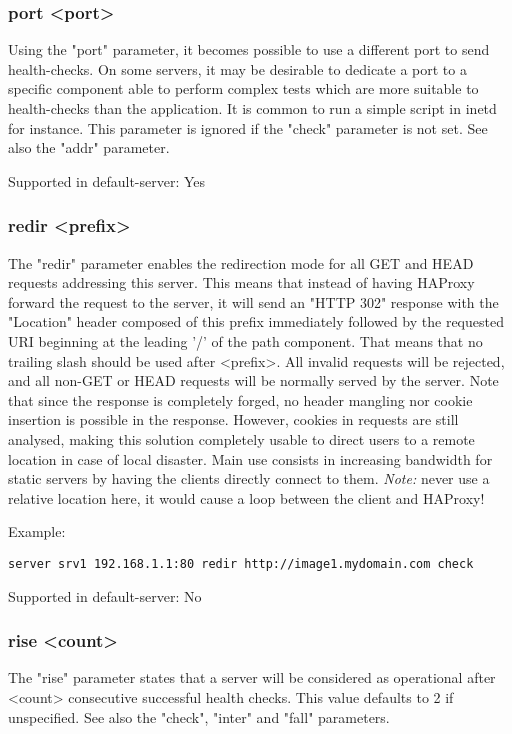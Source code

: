 \subsubsection[port]{port <port>}
  Using the "port" parameter, it becomes possible to use a different port to
  send health-checks. On some servers, it may be desirable to dedicate a port
  to a specific component able to perform complex tests which are more suitable
  to health-checks than the application. It is common to run a simple script in
  inetd for instance. This parameter is ignored if the "check" parameter is not
  set. See also the "addr" parameter.

  Supported in default-server: Yes

\subsubsection[redir]{redir <prefix>}
  The "redir" parameter enables the redirection mode for all GET and HEAD
  requests addressing this server. This means that instead of having HAProxy
  forward the request to the server, it will send an "HTTP 302" response with
  the "Location" header composed of this prefix immediately followed by the
  requested URI beginning at the leading '/' of the path component. That means
  that no trailing slash should be used after <prefix>. All invalid requests
  will be rejected, and all non-GET or HEAD requests will be normally served by
  the server. Note that since the response is completely forged, no header
  mangling nor cookie insertion is possible in the response. However, cookies in
  requests are still analysed, making this solution completely usable to direct
  users to a remote location in case of local disaster. Main use consists in
  increasing bandwidth for static servers by having the clients directly
  connect to them. \emph{Note:} never use a relative location here, it would cause a
  loop between the client and HAProxy!

  Example:
  
  \verb|server srv1 192.168.1.1:80 redir http://image1.mydomain.com check|

  Supported in default-server: No

\subsubsection[rise]{rise <count>}
  The "rise" parameter states that a server will be considered as operational
  after <count> consecutive successful health checks. This value defaults to 2
  if unspecified. See also the "check", "inter" and "fall" parameters.

